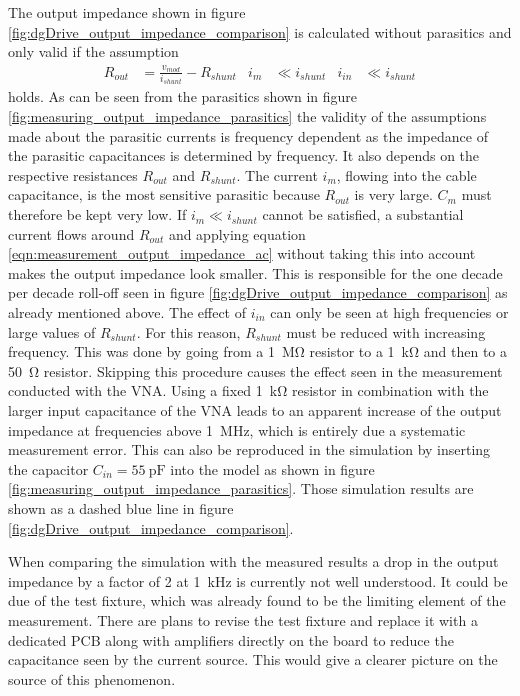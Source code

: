 The output impedance shown in figure \ref{fig:dgDrive_output_impedance_comparison} is calculated without parasitics and only valid if the assumption
\begin{align}
    R_{out} &= \frac{v_{mod}}{i_{shunt}} - R_{shunt} & i_m &\ll i_{shunt} & i_{in} &\ll i_{shunt} \label{eqn:measurement_output_impedance_ac}
\end{align}
holds. As can be seen from the parasitics shown in figure \ref{fig:measuring_output_impedance_parasitics} the validity of the assumptions made about the parasitic currents is frequency dependent as the impedance of the parasitic capacitances is determined by frequency. It also depends on the respective resistances $R_{out}$ and $R_{shunt}$. The current $i_m$, flowing into the cable capacitance, is the most sensitive parasitic because $R_{out}$ is very large. $C_m$ must therefore be kept very low. If $i_m \ll i_{shunt}$ cannot be satisfied, a substantial current flows around $R_{out}$ and applying equation \ref{eqn:measurement_output_impedance_ac} without taking this into account makes the output impedance look smaller. This is responsible for the one decade per decade roll-off seen in figure \ref{fig:dgDrive_output_impedance_comparison} as already mentioned above. The effect of $i_{in}$ can only be seen at high frequencies or large values of $R_{shunt}$. For this reason, $R_{shunt}$ must be reduced with increasing frequency. This was done by going from a \qty{1}{\mega\ohm} resistor to a \qty{1}{\kilo\ohm} and then to a \qty{50}{\ohm} resistor. Skipping this procedure causes the effect seen in the measurement conducted with the VNA. Using a fixed \qty{1}{\kilo\ohm} resistor in combination with the larger input capacitance of the VNA leads to an apparent increase of the output impedance at frequencies above \qty{1}{\MHz}, which is entirely due a systematic measurement error. This can also be reproduced in the simulation by inserting the capacitor $C_{in} = \qty{55}{\pF}$ into the model as shown in figure \ref{fig:measuring_output_impedance_parasitics}. Those simulation results are shown as a dashed blue line in figure \ref{fig:dgDrive_output_impedance_comparison}.

When comparing the simulation with the measured results a drop in the output impedance by a factor of \num{2} at \qty{1}{\kHz} is currently not well understood. It could be due of the test fixture, which was already found to be the limiting element of the measurement. There are plans to revise the test fixture and replace it with a dedicated PCB along with amplifiers directly on the board to reduce the capacitance seen by the current source. This would give a clearer picture on the source of this phenomenon.

